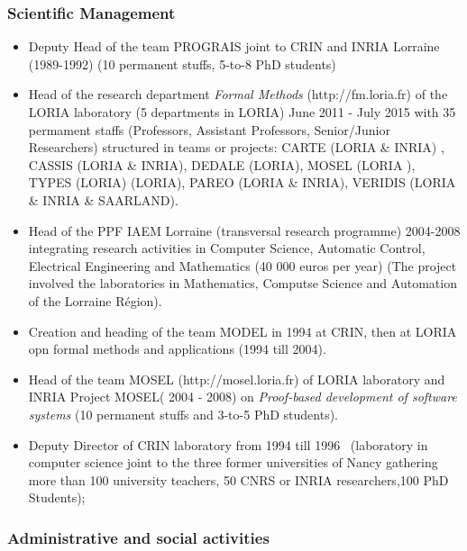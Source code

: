 \documentclass[ 12pt]{article}
\begin{document}
\subsubsection{Scientific Management}

\begin{itemize}


\item Deputy Head of the team  PROGRAIS  joint to CRIN  and INRIA Lorraine (1989-1992) (10 permanent stuffs, 5-to-8 PhD students)

\item Head of the research department   \textit{Formal Methods}
  (http://fm.loria.fr) of the LORIA laboratory (5 departments in LORIA)     June 2011 - July 2015  with  35 permament staffs (Professors, Assistant Professors, Senior/Junior Researchers)  structured in  teams or projects: CARTE (LORIA \& INRIA) , CASSIS  (LORIA \& INRIA), DEDALE (LORIA), MOSEL (LORIA ), TYPES (LORIA)  (LORIA), PAREO  (LORIA \& INRIA), VERIDIS (LORIA \& INRIA \& SAARLAND). 

\item Head of the  PPF IAEM Lorraine (transversal research programme)  2004-2008 integrating  research activities in Computer Science, Automatic Control, Electrical Engineering  and Mathematics  (40 000 euros per year) (The project involved the laboratories in Mathematics, Computse Science and Automation of the Lorraine R\'egion). 

\item Creation and heading of the team  MODEL  in  1994 at  CRIN, then at  LORIA opn formal methods and applications (1994 till 2004).

\item Head of the team  MOSEL (http://mosel.loria.fr) of LORIA laboratory  and INRIA Project   MOSEL( 2004 -  2008) on  \textit{Proof-based development of software systems} (10 permanent stuffs and 3-to-5 PhD students).

\item Deputy Director of CRIN laboratory from  1994 till  1996~ (laboratory in computer science  joint to the three former universities of Nancy gathering more than 100 university teachers, 50 CNRS or INRIA researchers,100 PhD Students);



\end{itemize}


\subsubsection{Administrative and social activities}
\end{document}
